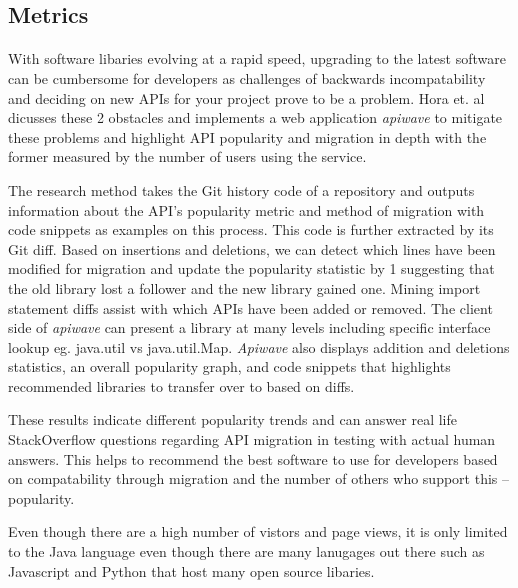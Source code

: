 \documentclass[12pt]{article}
\begin{document}


\subsection{Metrics}
\paragraph{}
With software libaries evolving at a rapid speed, upgrading to the latest software can be cumbersome for developers
as challenges of backwards incompatability and deciding on new APIs for your project prove to be a problem.
Hora et. al \cite{apiwave} dicusses these 2 obstacles and implements a web application \textit{apiwave} \cite{apiwavewebsite} to mitigate these problems and
highlight API popularity and migration in depth with the former measured by the number of users using the service.

The research method takes the Git history code of a repository and outputs information about the API's popularity metric and method of migration with code snippets as examples on this process.
This code is further extracted by its Git diff. Based on insertions and deletions, we can detect which lines have been modified for migration 
and update the popularity statistic by 1 suggesting that the old library lost a follower and the new library gained one.
Mining import statement diffs assist with which APIs have been added or removed.
The client side of \textit{apiwave} \cite{apiwavewebsite} can present a library at many levels including specific interface lookup eg. java.util vs java.util.Map.
\textit{Apiwave} also displays addition and deletions statistics, an overall popularity graph, 
and code snippets that highlights recommended libraries to transfer over to based on diffs.

These results indicate different popularity trends and can answer real life StackOverflow \cite{stackoverflow} 
questions regarding API migration in testing with actual human answers. 
This helps to recommend the best software to use for developers based on compatability through migration
and the number of others who support this -- popularity.

Even though there are a high number of vistors and page views, it is only limited to the Java language even though there are many lanugages out there
such as Javascript and Python that host many open source libaries. 
\end{document}
